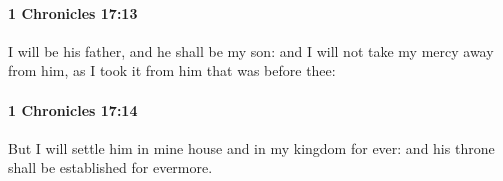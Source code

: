 		\paragraph{1 Chronicles 17:13} %
			\label{1CHRONICLES-17-13}

			I will be his father, and he shall be my son: and I will not take my mercy away from him, as I took it from him that was before thee:


		\paragraph{1 Chronicles 17:14} %
			\label{1CHRONICLES-17-14}

			But I will settle him in mine house and in my kingdom for ever: and his throne shall be established for evermore.


